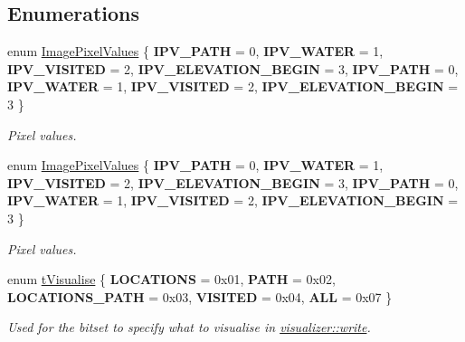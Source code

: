 \subsection*{Enumerations}
\begin{DoxyCompactItemize}
\item 
\mbox{\label{namespacevisualizer_af36cea222d0362709a55b17474afcc8a}} 
enum \mbox{\hyperlink{namespacevisualizer_af36cea222d0362709a55b17474afcc8a}{Image\+Pixel\+Values}} \{ \newline
{\bfseries I\+P\+V\+\_\+\+P\+A\+TH} = 0, 
{\bfseries I\+P\+V\+\_\+\+W\+A\+T\+ER} = 1, 
{\bfseries I\+P\+V\+\_\+\+V\+I\+S\+I\+T\+ED} = 2, 
{\bfseries I\+P\+V\+\_\+\+E\+L\+E\+V\+A\+T\+I\+O\+N\+\_\+\+B\+E\+G\+IN} = 3, 
\newline
{\bfseries I\+P\+V\+\_\+\+P\+A\+TH} = 0, 
{\bfseries I\+P\+V\+\_\+\+W\+A\+T\+ER} = 1, 
{\bfseries I\+P\+V\+\_\+\+V\+I\+S\+I\+T\+ED} = 2, 
{\bfseries I\+P\+V\+\_\+\+E\+L\+E\+V\+A\+T\+I\+O\+N\+\_\+\+B\+E\+G\+IN} = 3
 \}
\begin{DoxyCompactList}\small\item\em Pixel values. \end{DoxyCompactList}\item 
\mbox{\label{namespacevisualizer_af36cea222d0362709a55b17474afcc8a}} 
enum \mbox{\hyperlink{namespacevisualizer_af36cea222d0362709a55b17474afcc8a}{Image\+Pixel\+Values}} \{ \newline
{\bfseries I\+P\+V\+\_\+\+P\+A\+TH} = 0, 
{\bfseries I\+P\+V\+\_\+\+W\+A\+T\+ER} = 1, 
{\bfseries I\+P\+V\+\_\+\+V\+I\+S\+I\+T\+ED} = 2, 
{\bfseries I\+P\+V\+\_\+\+E\+L\+E\+V\+A\+T\+I\+O\+N\+\_\+\+B\+E\+G\+IN} = 3, 
\newline
{\bfseries I\+P\+V\+\_\+\+P\+A\+TH} = 0, 
{\bfseries I\+P\+V\+\_\+\+W\+A\+T\+ER} = 1, 
{\bfseries I\+P\+V\+\_\+\+V\+I\+S\+I\+T\+ED} = 2, 
{\bfseries I\+P\+V\+\_\+\+E\+L\+E\+V\+A\+T\+I\+O\+N\+\_\+\+B\+E\+G\+IN} = 3
 \}
\begin{DoxyCompactList}\small\item\em Pixel values. \end{DoxyCompactList}\item 
\mbox{\label{namespacevisualizer_ad08cef44b6dbff468f08c62effe9cb8f}} 
enum \mbox{\hyperlink{namespacevisualizer_ad08cef44b6dbff468f08c62effe9cb8f}{t\+Visualise}} \{ \newline
{\bfseries L\+O\+C\+A\+T\+I\+O\+NS} = 0x01, 
{\bfseries P\+A\+TH} = 0x02, 
{\bfseries L\+O\+C\+A\+T\+I\+O\+N\+S\+\_\+\+P\+A\+TH} = 0x03, 
{\bfseries V\+I\+S\+I\+T\+ED} = 0x04, 
\newline
{\bfseries A\+LL} = 0x07
 \}
\begin{DoxyCompactList}\small\item\em Used for the bitset to specify what to visualise in \mbox{\hyperlink{namespacevisualizer_addbe7459069b4e845756152e1804ca76}{visualizer\+::write}}. \end{DoxyCompactList}\end{DoxyCompactItemize}
